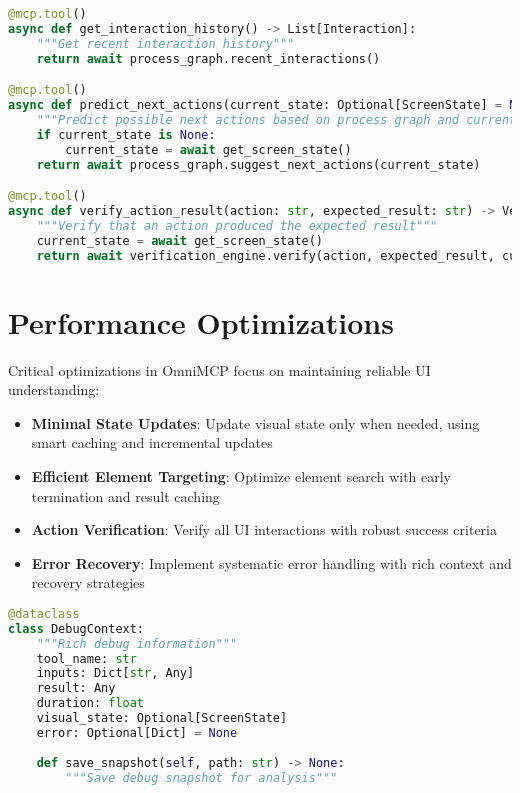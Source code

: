 \documentclass{article}
\begin{document}
\begin{lstlisting}[language=Python]
@mcp.tool()
async def get_interaction_history() -> List[Interaction]:
    """Get recent interaction history"""
    return await process_graph.recent_interactions()

@mcp.tool()
async def predict_next_actions(current_state: Optional[ScreenState] = None) -> List[ActionPrediction]:
    """Predict possible next actions based on process graph and current state"""
    if current_state is None:
        current_state = await get_screen_state()
    return await process_graph.suggest_next_actions(current_state)

@mcp.tool()
async def verify_action_result(action: str, expected_result: str) -> VerificationResult:
    """Verify that an action produced the expected result"""
    current_state = await get_screen_state()
    return await verification_engine.verify(action, expected_result, current_state)
\end{lstlisting}

\section{Performance Optimizations}

Critical optimizations in OmniMCP focus on maintaining reliable UI understanding:

\begin{itemize}
    \item \textbf{Minimal State Updates}: Update visual state only when needed, using smart caching and incremental updates
    \item \textbf{Efficient Element Targeting}: Optimize element search with early termination and result caching
    \item \textbf{Action Verification}: Verify all UI interactions with robust success criteria
    \item \textbf{Error Recovery}: Implement systematic error handling with rich context and recovery strategies
\end{itemize}

\begin{lstlisting}[language=Python]
@dataclass
class DebugContext:
    """Rich debug information"""
    tool_name: str
    inputs: Dict[str, Any]
    result: Any
    duration: float
    visual_state: Optional[ScreenState]
    error: Optional[Dict] = None
    
    def save_snapshot(self, path: str) -> None:
        """Save debug snapshot for analysis"""
\end{lstlisting}
\end{document}
